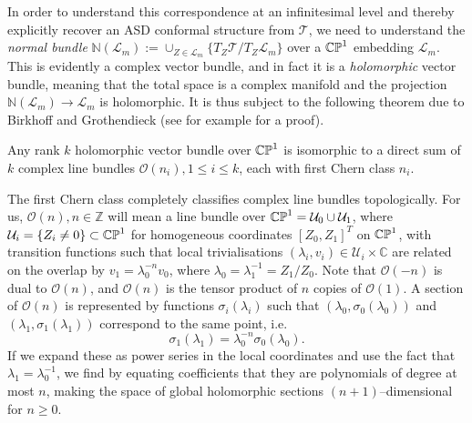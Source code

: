 In order to understand this correspondence at an infinitesimal level and thereby explicitly recover an ASD conformal structure from $\mathscr{T}$, we need to understand the \textit{normal bundle} $\mathbb{N}(\mathscr{L}_m):=\cup_{Z\in \mathscr{L}_m}\{T_Z\mathscr{T}/T_Z\mathscr{L}_m\}$ over a $\mathbb{CP}^1$ embedding $\mathscr{L}_m$. This is evidently a complex vector bundle, and in fact it is a \textit{holomorphic} vector bundle, meaning that the total space is a complex manifold and the projection $\mathbb{N}(\mathscr{L}_m)\rightarrow\mathscr{L}_m$ is holomorphic. It is thus subject to the following theorem due to Birkhoff and Grothendieck (see for example \cite{complex_mfds} for a proof).
\begin{theo}
Any rank $k$ holomorphic vector bundle over $\mathbb{CP}^1$ is isomorphic to a direct sum of $k$ complex line bundles $\mathcal{O}(n_i),1\leq i\leq k$, each with first Chern class $n_i$. 
\end{theo}

The first Chern class completely classifies complex line bundles topologically. For us, $\mathcal{O}(n),n\in\mathbb{Z}$ will mean a line bundle over $\mathbb{CP}^1=\mathcal{U}_0\cup\mathcal{U}_1$, where $\mathcal{U}_i=\{Z_i\neq 0\}\subset\mathbb{CP}^1$ for homogeneous coordinates $[Z_0,Z_1]^T$ on $\mathbb{CP}^1$, with transition functions such that local trivialisations $(\lambda_i,v_i)\in\mathcal{U}_i\times\mathbb{C}$ are related on the overlap by $v_1=\lambda_0^{-n}v_0$, where $\lambda_0=\lambda_1^{-1}=Z_1/Z_0$. Note that $\mathcal{O}(-n)$ is dual to $\mathcal{O}(n)$, and $\mathcal{O}(n)$ is the tensor product of $n$ copies of $\mathcal{O}(1)$. A section of $\mathcal{O}(n)$ is represented by functions $\sigma_i(\lambda_i)$ such that $(\lambda_0,\sigma_0(\lambda_0))$ and $(\lambda_1,\sigma_1(\lambda_1))$ correspond to the same point, i.e.
\[
\sigma_1(\lambda_1)=\lambda_0^{-n}\sigma_0(\lambda_0).
\]
If we expand these as power series in the local coordinates and use the fact that ${\lambda}_1=\lambda_0^{-1}$, we find by equating coefficients that they are polynomials of degree at most $n$, making the space of global holomorphic sections $(n+1)$--dimensional for $n\geq 0$.


